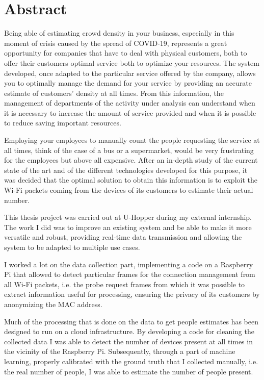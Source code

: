\chapter*{Abstract} %
\label{abstract}

\vspace{0.4 cm} 

Being able of estimating crowd density in your business, especially in this moment of crisis caused by the spread of COVID-19, represents a great opportunity for companies that have to deal with physical customers, both to offer their customers optimal service both to optimize your resources. The system developed, once adapted to the particular service offered by the company, allows you to optimally manage the demand for your service by providing an accurate estimate of customers' density at all times. From this information, the management of departments of the activity under analysis can understand when it is necessary to increase the amount of service provided and when it is possible to reduce saving important resources.

Employing your employees to manually count the people requesting the service at all times, think of the case of a bus or a supermarket, would be very frustrating for the employees but above all expensive. After an in-depth study of the current state of the art and of the different technologies developed for this purpose, it was decided that the optimal solution to obtain this information is to exploit the Wi-Fi packets coming from the devices of its customers to estimate their actual number.

This thesis project was carried out at U-Hopper during my external internship. The work I did was to improve an existing system and be able to make it more versatile and robust, providing real-time data transmission and allowing the system to be adapted to multiple use cases.

I worked a lot on the data collection part, implementing a code on a Raspberry Pi that allowed to detect particular frames for the connection management from all Wi-Fi packets, i.e. the probe request frames from which it was possible to extract information useful for processing, ensuring the privacy of its customers by anonymizing the MAC address.

Much of the processing that is done on the data to get people estimates has been designed to run on a cloud infrastructure. By developing a code for cleaning the collected data I was able to detect the number of devices present at all times in the vicinity of the Raspberry Pi. Subsequently, through a part of machine learning, properly calibrated with the ground truth that I collected manually, i.e. the real number of people, I was able to estimate the number of people present.

